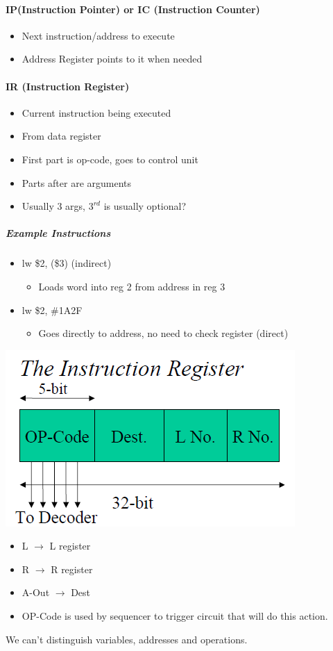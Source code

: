 \documentclass[12 pt]{article}
\begin{document}
	\paragraph{IP(Instruction Pointer) or IC (Instruction Counter)}
	\begin{itemize}
		\item Next instruction/address to execute
		\item Address Register points to it when needed
	\end{itemize}
	\paragraph{IR (Instruction Register)}
	\begin{itemize}
		\item Current instruction being executed
		\item From data register
		\item First part is op-code, goes to control unit
		\item Parts after are arguments
		\item Usually 3 args, $3^{rd}$ is usually optional?
	\end{itemize}
	\subparagraph{Example Instructions}
	\begin{itemize}
		\item lw \$2, (\$3) (indirect)
		\begin{itemize}
			\item Loads word into reg 2 from address in reg 3
		\end{itemize}
		\item lw \$2, \#1A2F
		\begin{itemize}
			\item Goes directly to address, no need to check register (direct)
		\end{itemize}
		\end{itemize}
	\includegraphics[scale=0.5]{ir.png}
	\begin{itemize}
		\item L $\to$ L register
		\item R $\to$ R register
		\item A-Out $\to$ Dest
		\item OP-Code is used by sequencer to trigger circuit that will do this action.
	\end{itemize}
	We can't distinguish variables, addresses and operations.
\end{document}
